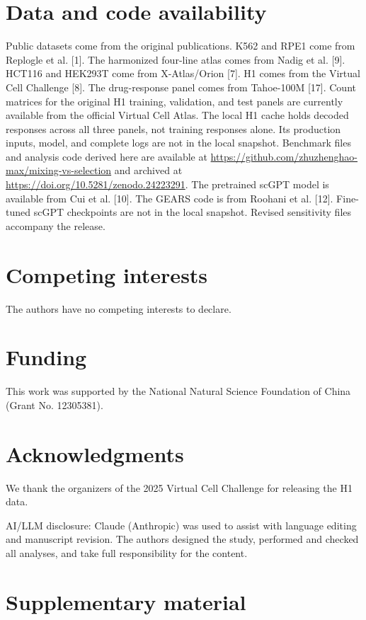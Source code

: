 \documentclass[12pt]{article}
\begin{document}
\section*{Data and code availability}

Public datasets come from the original publications. K562 and RPE1 come from Replogle et al. [1]. The harmonized four-line atlas comes from Nadig et al. [9]. HCT116 and HEK293T come from X-Atlas/Orion [7]. H1 comes from the Virtual Cell Challenge [8]. The drug-response panel comes from Tahoe-100M [17]. Count matrices for the original H1 training, validation, and test panels are currently available from the official Virtual Cell Atlas. The local H1 cache holds decoded responses across all three panels, not training responses alone. Its production inputs, model, and complete logs are not in the local snapshot. Benchmark files and analysis code derived here are available at \url{https://github.com/zhuzhenghao-max/mixing-vs-selection} and archived at \url{https://doi.org/10.5281/zenodo.24223291}. The pretrained scGPT model is available from Cui et al. [10]. The GEARS code is from Roohani et al. [12]. Fine-tuned scGPT checkpoints are not in the local snapshot. Revised sensitivity files accompany the release.

\section*{Competing interests}

The authors have no competing interests to declare.

\section*{Funding}

This work was supported by the National Natural Science Foundation of China (Grant No. 12305381).

\section*{Acknowledgments}

We thank the organizers of the 2025 Virtual Cell Challenge for releasing the H1 data.

AI/LLM disclosure: Claude (Anthropic) was used to assist with language editing and manuscript revision. The authors designed the study, performed and checked all analyses, and take full responsibility for the content.

\section*{Supplementary material}
\end{document}
